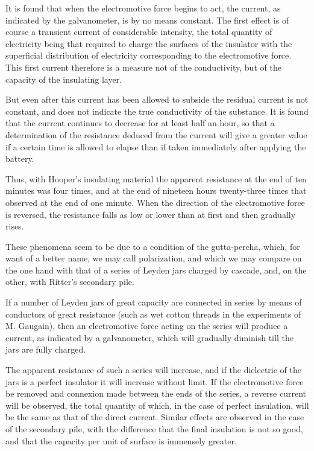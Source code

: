 \documentclass[12pt,oneside]{book}[2021/10/04]
\newcommand{\¬}{\hphantom{0}}
\begin{document}
It is found that when the electromotive force begins to act, the
current, as indicated by the galvanometer, is by no means constant.
\hypertarget{234:1}{}
The first effect is of course a transient current of considerable
intensity, the total quantity of electricity being that required to
charge the surfaces of the insulator with the superficial distribution
of electricity corresponding to the electromotive force. This first
current therefore is a measure not of the conductivity, but of the
capacity of the insulating layer.

But even after this current has been allowed to subside the
residual current is not constant, and does not indicate the true
conductivity of the substance. It is found that the current continues
to decrease for at least half an hour, so that a determination
of the resistance deduced from the current will give a greater value
if a certain time is allowed to elapse than if taken immediately
after applying the battery.

Thus, with Hooper's insulating material the apparent resistance
at the end of ten minutes was four times, and at the end of
nineteen hours twenty-three times that observed at the end of
one minute. When the direction of the electromotive force is
reversed, the resistance falls as low or lower than at first and
then gradually rises.

These phenomena seem to be due to a condition of the gutta-percha,
which, for want of a better name, we may call polarization,
and which we may compare on the one hand with that of a series
of Leyden jars charged by cascade, and, on the other, with Ritter's
secondary pile.

If a number of Leyden jars of great capacity are connected in
series by means of conductors of great resistance (such as wet
cotton threads in the experiments of M. Gaugain), then an electromotive
force acting on the series will produce a current, as
indicated by a galvanometer, which will gradually diminish till
the jars are fully charged.

The apparent resistance of such a series will increase, and if the
dielectric of the jars is a perfect insulator it will increase without
limit. If the electromotive force be removed and connexion made
between the ends of the series, a reverse current will be observed,
the total quantity of which, in the case of perfect insulation, will be
the same as that of the direct current. Similar effects are observed
in the case of the secondary pile, with the difference that the final
insulation is not so good, and that the capacity per unit of surface
is immensely greater.
\end{document}
